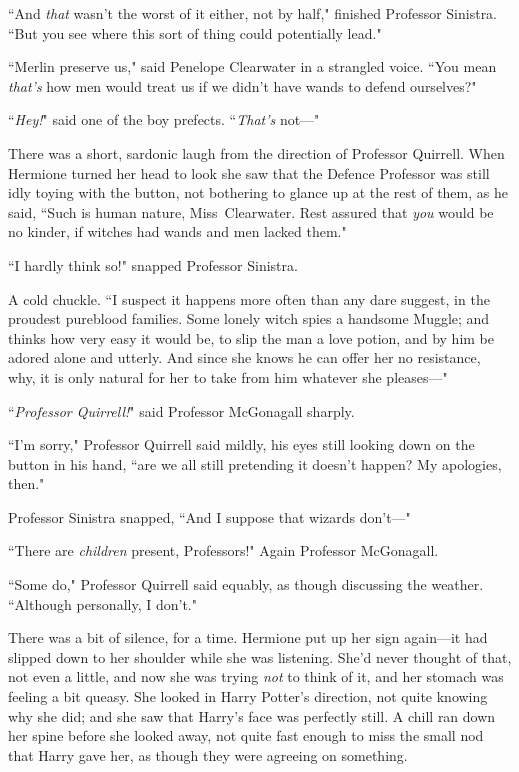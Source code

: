 ``And \emph{that} wasn't the worst of it either, not by half," finished Professor Sinistra. ``But you see where this sort of thing could potentially lead."

``Merlin preserve us," said Penelope Clearwater in a strangled voice. ``You mean \emph{that's} how men would treat us if we didn't have wands to defend ourselves?"

``\emph{Hey!}" said one of the boy prefects. ``\emph{That's} not—"

There was a short, sardonic laugh from the direction of Professor Quirrell. When Hermione turned her head to look she saw that the Defence Professor was still idly toying with the button, not bothering to glance up at the rest of them, as he said, ``Such is human nature, Miss~Clearwater. Rest assured that \emph{you} would be no kinder, if witches had wands and men lacked them."

``I hardly think so!" snapped Professor Sinistra.

A cold chuckle. ``I suspect it happens more often than any dare suggest, in the proudest pureblood families. Some lonely witch spies a handsome Muggle; and thinks how very easy it would be, to slip the man a love potion, and by him be adored alone and utterly. And since she knows he can offer her no resistance, why, it is only natural for her to take from him whatever she pleases—"

``\emph{Professor Quirrell!}" said Professor McGonagall sharply.

``I'm sorry," Professor Quirrell said mildly, his eyes still looking down on the button in his hand, ``are we all still pretending it doesn't happen? My apologies, then."

Professor Sinistra snapped, ``And I suppose that wizards don't—"

``There are \emph{children} present, Professors!" Again Professor McGonagall.

``Some do," Professor Quirrell said equably, as though discussing the weather. ``Although personally, I don't."

There was a bit of silence, for a time. Hermione put up her sign again—it had slipped down to her shoulder while she was listening. She'd never thought of that, not even a little, and now she was trying \emph{not} to think of it, and her stomach was feeling a bit queasy. She looked in Harry Potter's direction, not quite knowing why she did; and she saw that Harry's face was perfectly still. A chill ran down her spine before she looked away, not quite fast enough to miss the small nod that Harry gave her, as though they were agreeing on something.

